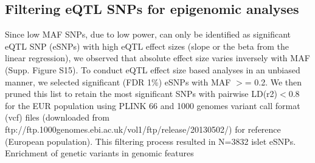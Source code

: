 \subsection{Filtering eQTL SNPs for epigenomic analyses}
Since low MAF SNPs, due to low power, can only be identified as significant eQTL SNP (eSNPs) with high eQTL effect sizes (slope or the beta from the linear regression), we observed that absolute effect size varies inversely with MAF (Supp. Figure S15). To conduct eQTL effect size based analyses in an unbiased manner, we selected significant (FDR 1\%) eSNPs with MAF $>$= 0.2. We then pruned this list to retain the most significant SNPs with pairwise LD(r2)$<$0.8 for the EUR population using PLINK 66 and 1000 genomes variant call format (vcf) files (downloaded from ftp://ftp.1000genomes.ebi.ac.uk/vol1/ftp/release/20130502/) for reference (European population). This filtering process resulted in N=3832 islet eSNPs.
Enrichment of genetic variants in genomic features \\
    
